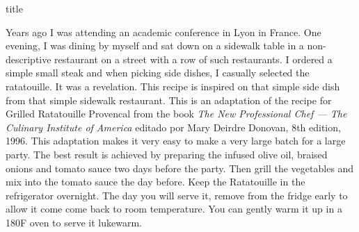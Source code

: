 \documentclass [11pt, letterpaper] {article}
\begin{document}
 {title}

Years ago I was attending an academic conference in Lyon in France. One evening, I was dining by myself and sat down on a sidewalk table in a non-descriptive restaurant on a street with a row of such restaurants. I ordered a simple small steak and when picking side dishes, I casually selected the ratatouille. It was a revelation. This recipe is inspired on that simple side dish from that simple sidewalk restaurant. This is an adaptation of the recipe for Grilled Ratatouille Provencal from the book {\em The New Professional Chef --- The Culinary Institute of America} editado por Mary Deirdre Donovan, 8th edition, 1996. This adaptation makes it very easy to make a very large batch for a large party. The best result is achieved by preparing the infused olive oil, braised onions and tomato sauce two days before the party. Then grill the vegetables and mix into the tomato sauce the day before. Keep the Ratatouille in the refrigerator overnight. The day you will serve it, remove from the fridge early to allow it come come back to room temperature. You can gently warm it up in a 180F oven to serve it lukewarm.
\vspace{0.5in}
\end{document}
